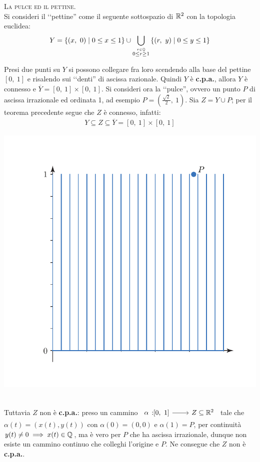 \begin{example}\textsc{La pulce ed il pettine.}\\
	Si consideri il ‘‘pettine'' come il seguente sottospazio di $\mathbb{R} ^2$ con la topologia euclidea:
		\begin{equation*}
			Y= \left\{ (x,\ 0) \mid 0\leq x\leq 1 \right\} \cup \mathop{{\bigcup}}\displaylimits_{\stackrel{r\in\mathbb{Q}}{ 0\leq r\geq 1}} \left\{ (r,\ y) \mid 0\leq y \leq 1 \right\}
		\end{equation*}
\begin{minipage}{0.62\textwidth}
Presi due punti su $Y$ si possono collegare fra loro scendendo alla base del pettine $\left[0,\ 1\right]$ e risalendo sui ‘‘denti'' di ascissa razionale. Quindi $Y$ è \textbf{c.p.a.}, allora $Y$ è connesso e $\overline{Y}=\left[0,\ 1\right]\times \left[0,\ 1\right]$.\newline 
Si consideri ora la ‘‘pulce'', ovvero un punto $P$ di ascissa irrazionale ed ordinata 1, ad esempio $P=\left(\frac{\sqrt{2}}{2},\ 1\right)$. Sia $Z=Y\cup P$; per il teorema precedente segue che $Z$ è connesso, infatti:
\begin{gather*}
	Y\subseteq Z \subseteq \overline{Y}=\left[0,\ 1\right]\times \left[0,\ 1\right]	
\end{gather*}
	\end{minipage}
	\begin{minipage}{0.37\textwidth}
		\includegraphics[trim=1.1cm 0.5cm 0.5cm 1.25cm,clip,scale=0.50]{images/comb.pdf}
	\end{minipage}\\
Tuttavia $Z$ non è \textbf{c.p.a.}: preso un cammino $\funz \alpha {\left[0,\ 1\right]} {Z\subseteq \realset^2}$ tale che $\alpha(t)= \left( x(t), y(t)\right)$ con $\alpha (0)=(0,0)$ e $\alpha(1)=P$, per continuità $y(t)\neq 0 \implies x(t)\in\mathbb{Q}$, ma è vero per $P$ che ha ascissa irrazionale, dunque non esiste un cammino continuo che colleghi l'origine e $P$. Ne consegue che $Z$ non è \textbf{c.p.a.}.
\end{example}

